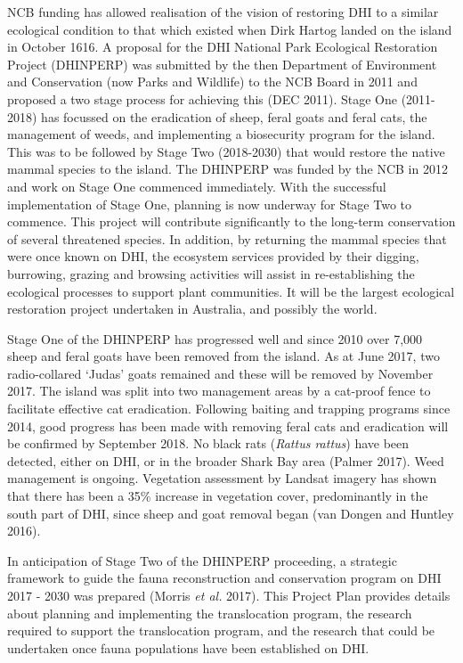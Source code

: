 \documentclass[version=last,
    paper=a4,                               %
    10pt,                                   %
    dvipsnames,
    oneside,                              %
    headings=openany,                       %
    open=any,
    BCOR=7mm,                               %
    DIV=15,     %
]{scrbook}
\begin{document}
NCB funding has allowed realisation of the vision of restoring DHI to a
similar ecological condition to that which existed when Dirk Hartog
landed on the island in October 1616. A proposal for the DHI National
Park Ecological Restoration Project (DHINPERP) was submitted by the then
Department of Environment and Conservation (now Parks and Wildlife) to
the NCB Board in 2011 and proposed a two stage process for achieving
this (DEC 2011). Stage One (2011-2018) has focussed on the eradication
of sheep, feral goats and feral cats, the management of weeds, and
implementing a biosecurity program for the island. This was to be
followed by Stage Two (2018-2030) that would restore the native mammal
species to the island. The DHINPERP was funded by the NCB in 2012 and
work on Stage One commenced immediately. With the successful
implementation of Stage One, planning is now underway for Stage Two to
commence. This project will contribute significantly to the long-term
conservation of several threatened species. In addition, by returning
the mammal species that were once known on DHI, the ecosystem services
provided by their digging, burrowing, grazing and browsing activities
will assist in re-establishing the ecological processes to support plant
communities. It will be the largest ecological restoration project
undertaken in Australia, and possibly the world.

Stage One of the DHINPERP has progressed well and since 2010 over 7,000
sheep and feral goats have been removed from the island. As at June
2017, two radio-collared `Judas' goats remained and these will be
removed by November 2017. The island was split into two management areas
by a cat-proof fence to facilitate effective cat eradication. Following
baiting and trapping programs since 2014, good progress has been made
with removing feral cats and eradication will be confirmed by September
2018. No black rats (\emph{Rattus rattus}) have been detected, either on
DHI, or in the broader Shark Bay area (Palmer 2017). Weed management is
ongoing. Vegetation assessment by Landsat imagery has shown that there
has been a 35\% increase in vegetation cover, predominantly in the south
part of DHI, since sheep and goat removal began (van Dongen and Huntley
2016).

In anticipation of Stage Two of the DHINPERP proceeding, a strategic
framework to guide the fauna reconstruction and conservation program on
DHI 2017 - 2030 was prepared (Morris \emph{et al.} 2017). This Project
Plan provides details about planning and implementing the translocation
program, the research required to support the translocation program, and
the research that could be undertaken once fauna populations have been
established on DHI.
\end{document}
